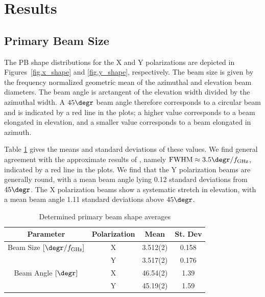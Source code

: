 \documentclass[preprint]{aastex}
\begin{document}
\section{Results}\label{s.results}

\subsection{Primary Beam Size}\label{ss.beamsize}
The PB shape distributions for the X and Y polarizations are depicted in 
Figures~\ref{fig.x_shape} and \ref{fig.y_shape}, respectively.  The beam size 
is given by the frequency normalized geometric mean of the azimuthal and 
elevation beam diameters.  The beam angle is arctangent of the elevation 
width divided by the azimuthal width. A $45\degr$ beam angle therefore 
corresponds to a circular beam and is indicated by a red line in the plots; a 
higher value corresponds to a beam elongated in elevation, and a
smaller value corresponds to a beam elongated in azimuth.

Table \ref{tab.beamshape} gives the means and standard
deviations of these values.  We find general agreement with the
approximate results of \citet{Harp2011}, namely $\textrm{FWHM} \approx
3.5\degr / f_\textrm{GHz}$, indicated by a red line in the plots.  We find 
that the Y polarization beams are generally round, with a mean beam angle 
lying 0.12 standard deviations from $45\degr$.  The X polarization beams 
show a systematic stretch in elevation, with a mean beam angle 1.11 
standard deviations above $45\degr$.

\begin{table}[htb]
\begin{center}
\begin{tabular}{cccc}
Parameter & Polarization & Mean & St. Dev \\
\hline
Beam Size $[\degr / f_\textrm{GHz}]$ & X & 3.512(2) & 0.158 \\
  & Y & 3.517(2) & 0.176 \\ \hline
Beam Angle $[\degr]$ & X & 46.54(2) & 1.39 \\
  & Y & 45.19(2) & 1.59
\end{tabular}
\caption{Determined primary beam shape averages \label{tab.beamshape}}
\end{center}
\end{table}
\end{document}
